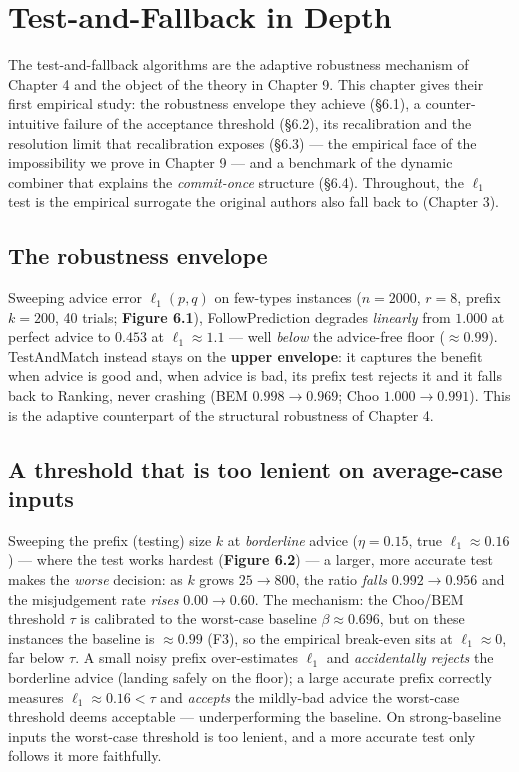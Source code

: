 \chapter{Test-and-Fallback in Depth}\label{test-and-fallback-in-depth}

The test-and-fallback algorithms are the adaptive robustness mechanism of Chapter 4 and the
object of the theory in Chapter 9. This chapter gives their first empirical study: the
robustness envelope they achieve (§6.1), a counter-intuitive failure of the acceptance
threshold (§6.2), its recalibration and the resolution limit that recalibration exposes
(§6.3) --- the empirical face of the impossibility we prove in Chapter 9 --- and a benchmark of
the dynamic combiner that explains the \emph{commit-once} structure (§6.4). Throughout, the
\(\ell_1\) test is the empirical surrogate the original authors also fall back to (Chapter 3).

\section{The robustness envelope}\label{the-robustness-envelope}

Sweeping advice error \(\ell_1(p,q)\) on few-types instances (\(n=2000\), \(r=8\), prefix \(k=200\),
40 trials; \textbf{Figure 6.1}), FollowPrediction degrades \emph{linearly} from \(1.000\) at perfect
advice to \(0.453\) at \(\ell_1\!\approx\!1.1\) --- well \emph{below} the advice-free floor
(\(\approx0.99\)). TestAndMatch instead stays on the \textbf{upper envelope}: it captures the
benefit when advice is good and, when advice is bad, its prefix test rejects it and it falls
back to Ranking, never crashing (BEM \(0.998\to0.969\); Choo \(1.000\to0.991\)). This is the
adaptive counterpart of the structural robustness of Chapter 4.

\section{A threshold that is too lenient on average-case inputs}\label{a-threshold-that-is-too-lenient-on-average-case-inputs}

Sweeping the prefix (testing) size \(k\) at \emph{borderline} advice (\(\eta=0.15\), true
\(\ell_1\!\approx\!0.16\)) --- where the test works hardest (\textbf{Figure 6.2}) --- a larger, more
accurate test makes the \emph{worse} decision: as \(k\) grows \(25\to800\), the ratio \emph{falls}
\(0.992\to0.956\) and the misjudgement rate \emph{rises} \(0.00\to0.60\). The mechanism: the Choo/BEM
threshold \(\tau\) is calibrated to the worst-case baseline \(\beta\approx0.696\), but on these
instances the baseline is \(\approx0.99\) (F3), so the empirical break-even sits at
\(\ell_1\approx0\), far below \(\tau\). A small noisy prefix over-estimates \(\ell_1\) and
\emph{accidentally rejects} the borderline advice (landing safely on the floor); a large accurate
prefix correctly measures \(\ell_1\approx0.16<\tau\) and \emph{accepts} the mildly-bad advice the
worst-case threshold deems acceptable --- underperforming the baseline. On strong-baseline
inputs the worst-case threshold is too lenient, and a more accurate test only follows it more
faithfully.

